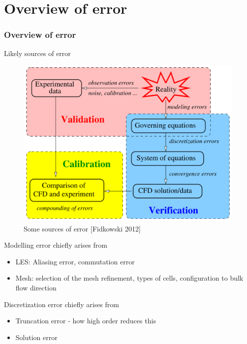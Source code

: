 \documentclass{beamer}
\begin{document}
\section[Error]{Overview of error}
\begin{frame}%
\frametitle{Overview of error}
\vspace{-5pt}
\begin{minipage}[t][0.7\textheight]{1\textwidth}
\scriptsize
\vspace{-20pt}
\begin{block}{Likely sources of error}
\vspace{-10pt}
\begin{figure}[h!]
\includegraphics[height=0.47\textwidth]{./figs/Error.png}
\vspace{-5pt}
\caption{Some sources of error [Fidkowski 2012]}
\label{fig:Fidk}
\end{figure}
\vspace{-20pt}
\end{block}
\end{minipage}
\vspace{-8pt}
\tiny
Modelling error chiefly arises from
\begin{itemize}
\item LES: Aliasing error, commutation error
\item Mesh: selection of the mesh refinement, types of cells, configuration to bulk flow direction
\end{itemize}
Discretization error chiefly arises from
\begin{itemize}
\item Truncation error - how high order reduces this
\item Solution error
\end{itemize}
\end{frame}


\end{document}
